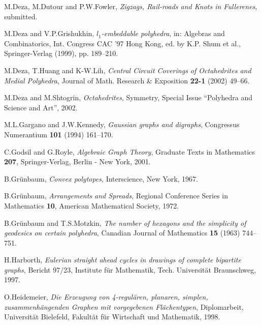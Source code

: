\documentclass[12pt]{article}
\begin{document}
\begin{thebibliography}{99}



M.Deza, M.Dutour and P.W.Fowler,
{\em Zigzags, Rail-roads and Knots in Fullerenes},
submitted.


M.Deza and V.P.Grishukhin,
{\em $l_1$-embeddable polyhedra},
in: Algebras and Combinatorics, Int. Congress CAC '97 Hong Kong,
ed. by K.P. Shum et al., Springer-Verlag (1999), pp. 189--210.


M.Deza, T.Huang and K-W.Lih,
{\em Central Circuit Coverings of Octahedrites and Medial Polyhedra},
Journal of Math. Research \& Exposition {\bf 22-1} (2002) 49--66.


M.Deza and M.Shtogrin,
{\em Octahedrites}, 
Symmetry, Special Issue ``Polyhedra and Science and Art'', 2002.


M.L.Gargano and J.W.Kennedy,
{\em Gaussian graphs and digraphs}, Congressus Numerantium {\bf 101}
(1994) 161--170.


C.Godsil and G.Royle, {\em Algebraic Graph Theory}, Graduate Texts in 
Mathematics {\bf 207}, Springer-Verlag, Berlin - New York, 2001.


B.Gr\"{u}nbaum, {\em Convex polytopes}, Interscience, New York, 1967.


B.Gr\"{u}nbaum, {\em Arrangements and Spreads}, Regional Conference Series in
Mathematics {\bf 10}, American Mathematical Society, 1972.


B.Gr\"{u}nbaum and T.S.Motzkin, {\em The number of hexagons and the simplicity
of geodesics on certain polyhedra}, Canadian Journal of Mathematics {\bf 15} (1963) 744--751.


H.Harborth, {\em Eulerian straight ahead cycles in drawings of complete
bipartite graphs}, Bericht 97/23, Institute f\"{u}r Mathematik, Tech. 
Universit\"{a}t
Braunschweg, 1997.


O.Heidemeier, {\em Die Erzeugung von 4-regul\"{a}ren, planaren,
simplen, zusammenh\"{a}ngenden Graphen mit vorgegebenen Fl\"{a}chentypen},
Diplomarbeit, Universit\"{a}t Bielefeld, Fakult\"{a}t f\"{u}r Wirtschaft und
Mathematik, 1998. 


\end{thebibliography}
\end{document}
